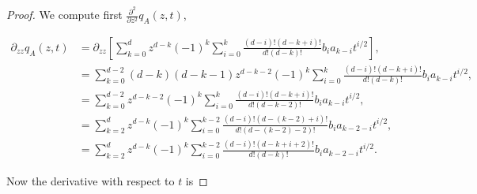 \begin{proof}
        



        We compute first $\frac{\partial^2}{\partial z^2}q_A(z,t)$,

        \begin{align*}
            \partial_{zz} q_A(z,t) %
            &= \partial_{zz} \left[ \sum_{k=0}^d z^{d-k}(-1)^k \sum_{i=0}^k \frac{(d-i)!(d-k+i)!}{d!(d-k)!} b_i a_{k-i} t^{i/2} \right],\\
            &= \sum_{k=0}^{d-2} (d-k)(d-k-1)z^{d-k-2}(-1)^k \sum_{i=0}^k \frac{(d-i)!(d-k+i)!}{d!(d-k)!} b_i a_{k-i} t^{i/2}, \\
            &= \sum_{k=0}^{d-2} z^{d-k-2}(-1)^k \sum_{i=0}^k \frac{(d-i)!(d-k+i)!}{d!(d-k-2)!} b_i a_{k-i} t^{i/2}, \\
            &= \sum_{k=2}^{d} z^{d-k}(-1)^k \sum_{i=0}^{k-2} \frac{(d-i)!(d-(k-2)+i)!}{d!(d-(k-2)-2)!} b_i a_{k-2-i}t^{i/2},\\ 
            &= \sum_{k=2}^{d} z^{d-k}(-1)^k \sum_{i=0}^{k-2} \frac{(d-i)!(d-k+i+2)!}{d!(d-k)!} b_i a_{k-2-i}t^{i/2}.
        \end{align*}

        Now the derivative with respect to $t$ is


\end{proof}
